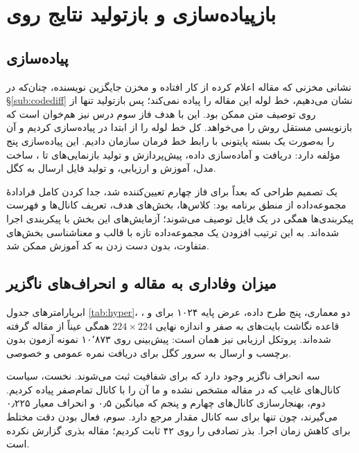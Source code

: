 \clearpage
\section{بازپیاده‌سازی و بازتولید نتایج روی }
\label{sec:repro}

\subsection{پیاده‌سازی}
نشانی مخزنی که مقاله اعلام کرده از کار افتاده و مخزن جایگزین نویسنده، چنان‌که در \S\ref{sub:codediff} نشان می‌دهیم، خط لوله این مقاله را پیاده نمی‌کند؛ پس بازتولید تنها از روی توصیف متن ممکن بود. این با هدف فاز سوم درس نیز هم‌خوان است که بازنویسی مستقل روش را می‌خواهد. کل خط لوله را از ابتدا در  پیاده‌سازی کردیم و آن را به‌صورت یک بسته پایتونی با رابط خط فرمان سازمان دادیم. این پیاده‌سازی پنج مؤلفه دارد: دریافت و آماده‌سازی داده، پیش‌پردازش و تولید بازنمایی‌های  تا ، ساخت مدل، آموزش و ارزیابی، و تولید فایل ارسال به کگل.

یک تصمیم طراحی که بعداً برای فاز چهارم تعیین‌کننده شد، جدا کردن کامل فرادادهٔ مجموعه‌داده از منطق برنامه بود: کلاس‌ها، بخش‌های هدف، تعریف کانال‌ها و فهرست پیکربندی‌ها همگی در یک فایل  توصیف می‌شوند؛ آزمایش‌های این بخش با پیکربندی  اجرا شده‌اند. به این ترتیب افزودن یک مجموعه‌داده تازه با قالب و معناشناسی بخش‌های متفاوت، بدون دست زدن به کد آموزش ممکن شد.

\subsection{میزان وفاداری به مقاله و انحراف‌های ناگزیر}
ابرپارامتر‌های جدول \ref{tab:hyper}، دو معماری، پنج طرح داده، عرض پایه \num{۱۰۲۴} برای  و ، قاعده نگاشت بایت‌های  به صفر و اندازه نهایی $224 \times 224$ همگی عیناً از مقاله گرفته شده‌اند. پروتکل ارزیابی نیز همان است: پیش‌بینی روی \num{۱۰٬۸۷۳} نمونه آزمون بدون برچسب و ارسال به سرور کگل برای دریافت نمره عمومی و خصوصی.

سه انحراف ناگزیر وجود دارد که برای شفافیت ثبت می‌شوند. نخست، سیاست کانال‌های غایب که در مقاله مشخص نشده و ما آن را با کانال تمام‌صفر پیاده کردیم. دوم، بهنجارسازی کانال‌های چهارم و پنجم که میانگین \num{۰٫۵} و انحراف معیار \num{۰٫۲۲۵} می‌گیرند، چون  تنها برای سه کانال مقدار مرجع دارد. سوم، فعال بودن دقت مختلط برای کاهش زمان اجرا. بذر تصادفی را روی \num{۴۲} ثابت کردیم؛ مقاله بذری گزارش نکرده است.

